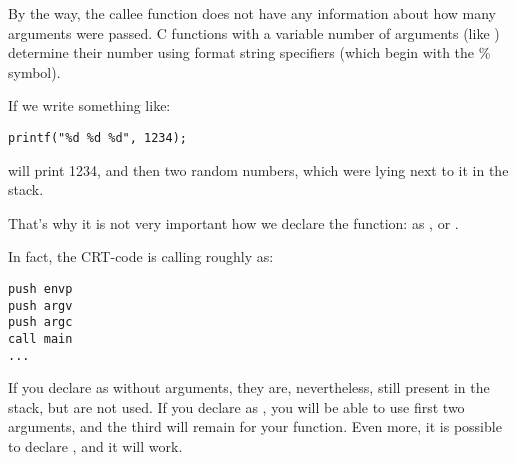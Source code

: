 \par
By the way, the \gls{callee} function does not have any information about how many arguments were passed.
C functions with a variable number of arguments (like \printf) determine their number using format string specifiers (which begin with the \% symbol).

If we write something like:

\begin{lstlisting}
printf("%d %d %d", 1234);
\end{lstlisting}

\printf will print 1234, and then two random numbers, which were lying next to it in the stack.

\par
That's why it is not very important how we declare the \main function: as \main,  or .

In fact, the \ac{CRT}-code is calling \main roughly as:
	
\begin{lstlisting}
push envp
push argv
push argc
call main
...
\end{lstlisting}

If you declare \main as \main without arguments, they are, nevertheless, still present in the stack, but are not used.
If you declare \main as  ,
you will be able to use first two arguments, and the third will remain  for your function.
Even more, it is possible to declare , and it will work.

